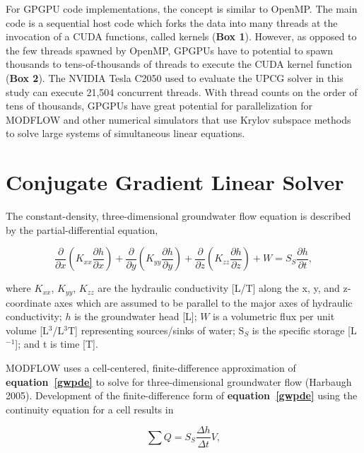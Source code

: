 \documentclass[12pt]{article}
\begin{document}
For GPGPU code implementations, the concept is similar to OpenMP.  The main code is a sequential host code which forks the data into many threads at the invocation of a CUDA \color{blue}functions, called kernels (\textbf{Box 1})\color{black}.  \color{blue}However, as opposed to the few threads spawned by OpenMP, GPGPUs have to potential to spawn thousands to tens-of-thousands of threads to execute the CUDA kernel function (\textbf{Box 2}). The NVIDIA Tesla C2050 used to evaluate the UPCG solver in this study can execute 21,504 concurrent threads. \color{black} With thread counts on the order of tens of thousands, GPGPUs have great potential for parallelization \color{blue} for MODFLOW and other numerical simulators that use Krylov subspace methods to solve large systems of simultaneous linear equations\color{black}.


\section* {\bf Conjugate Gradient Linear Solver}
The constant-density, three-dimensional groundwater flow equation is described by the partial-differential equation,

\begin{equation}
	\label{gwpde}
	\frac{\partial}{\partial x} \left( K_{xx} \frac{\partial h}{\partial x} \right) + 
	\frac{\partial}{\partial y} \left( K_{yy} \frac{\partial h}{\partial y} \right) + 
	\frac{\partial}{\partial z} \left( K_{zz} \frac{\partial h}{\partial z} \right) + 
	W = S_{S} \frac{\partial h}{\partial t} ,
\end{equation}

\noindent
where  $K_{xx}$, $K_{yy}$, $K_{zz}$ are the hydraulic conductivity [L/T] along the x, y, and z-coordinate axes which are assumed to be parallel to the major axes of hydraulic conductivity; $h$ is the groundwater head [L]; $W$ is a volumetric flux per unit volume [L$^{3}$/L$^{3}$T] representing sources/sinks of water; S$_{S}$ is the specific storage [L$^{-1}$]; and t is time [T].

MODFLOW uses a cell-centered, finite-difference approximation of \textbf{equation~\ref{gwpde}} to solve for three-dimensional groundwater flow (Harbaugh 2005). Development of the finite-difference form of \textbf{equation~\ref{gwpde}} using the continuity equation for a cell results in

\begin{equation}
	\label{conteq}
	\sum Q = S_{S} \frac{\Delta h}{\Delta t} V,
\end{equation}
\end{document}
